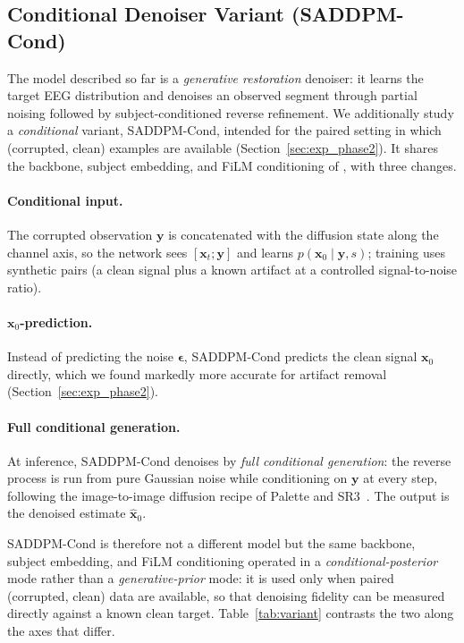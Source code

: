 \subsection{Conditional Denoiser Variant (\mbox{SADDPM-Cond})}
\label{sec:method_cond}

The \saddpm{} model described so far is a \emph{generative restoration} denoiser:
it learns the target EEG distribution and denoises an observed segment through
partial noising followed by subject-conditioned reverse refinement. We
additionally study a \emph{conditional} variant, \mbox{SADDPM-Cond}, intended for the
paired setting in which (corrupted, clean) examples are available
(Section~\ref{sec:exp_phase2}). It shares the backbone, subject embedding, and
FiLM conditioning of \saddpm{}, with three changes.

\paragraph{Conditional input.} The corrupted observation $\mathbf{y}$ is
concatenated with the diffusion state along the channel axis, so the network sees
$[\mathbf{x}_t;\mathbf{y}]$ and learns $p(\mathbf{x}_0\mid\mathbf{y},s)$; training
uses synthetic pairs (a clean signal plus a known artifact at a controlled
signal-to-noise ratio).

\paragraph{$\mathbf{x}_0$-prediction.} Instead of predicting the noise
$\boldsymbol{\epsilon}$, \mbox{SADDPM-Cond} predicts the clean signal $\mathbf{x}_0$
directly, which we found markedly more accurate for artifact removal
(Section~\ref{sec:exp_phase2}).

\paragraph{Full conditional generation.} At inference, \mbox{SADDPM-Cond} denoises by
\emph{full conditional generation}: the reverse process is run from pure Gaussian
noise while conditioning on $\mathbf{y}$ at every step, following the
image-to-image diffusion recipe of Palette and SR3~\cite{saharia2022palette,saharia2022sr3}.
The output is the denoised estimate $\hat{\mathbf{x}}_0$.

\mbox{SADDPM-Cond} is therefore not a different model but the same
backbone, subject embedding, and FiLM conditioning operated in a
\emph{conditional-posterior} mode rather than a \emph{generative-prior} mode: it is
used only when paired (corrupted, clean) data are available, so that denoising
fidelity can be measured directly against a known clean target. Table~\ref{tab:variant}
contrasts the two along the axes that differ.

